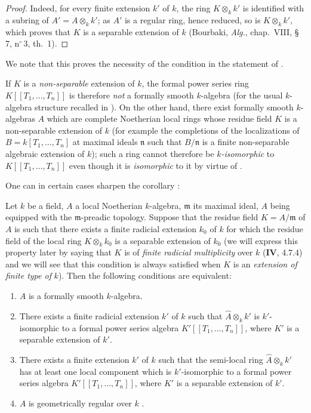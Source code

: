 \begin{proof}
Indeed, for every finite extension $k'$ of $k$, the ring $K\otimes_k k'$ is identified with a subring of $A'=A\otimes_k k'$;
as $A'$ is a regular ring, hence reduced, so is $K\otimes_k k'$, which proves that $K$ is a separable extension of $k$ (Bourbaki, \emph{Alg.}, chap.~VIII, \S\,7, n$^\circ$\,3, th.~1).
\end{proof}

We note that this proves the necessity of the condition in the statement of .

\begin{remark}[19.6.5.2]
\label{0.19.6.5.2}
If $K$ is a \emph{non-separable} extension of $k$, the formal power series ring $K[[T_1,\ldots,T_n]]$ is therefore \emph{not} a formally smooth $k$-algebra (for the usual $k$-algebra structure recalled in ).
On the other hand, there exist formally smooth $k$-algebras $A$ which are complete Noetherian local rings whose residue field $K$ is a non-separable extension of $k$ (for example the completions of the localizations of $B=k[T_1,\ldots,T_n]$ at maximal ideals $\mathfrak{n}$ such that $B/\mathfrak{n}$ is a finite non-separable algebraic extension of $k$);
such a ring cannot therefore be \emph{$k$-isomorphic} to $K[[T_1,\ldots,T_n]]$ even though it is \emph{isomorphic} to it by virtue of .

One can in certain cases sharpen the corollary :
\end{remark}

\begin{proposition}[19.6.6]
\label{0.19.6.6}
Let $k$ be a field, $A$ a local Noetherian $k$-algebra, $\mathfrak{m}$ its maximal ideal, $A$ being equipped with the $\mathfrak{m}$-preadic topology.
Suppose that the residue field $K=A/\mathfrak{m}$ of $A$ is such that there exists a finite radicial extension $k_0$ of $k$ for which the residue field of the local ring $K\otimes_k k_0$ is a separable extension of $k_0$ \textup{(we will express this property later by saying that $K$ is of \emph{finite radicial multiplicity} over $k$ ($\mathbf{IV}$, 4.7.4) and we will see that this condition is always satisfied when $K$ is an \emph{extension of finite type of} $k$)}.
Then the following conditions are equivalent:
\begin{enumerate}
  \item[\textup{a)}] $A$ is a formally smooth $k$-algebra.
  \item[\textup{b)}] There exists a finite radicial extension $k'$ of $k$ such that $\widehat{A}\otimes_k k'$ is $k'$-isomorphic to a formal power series algebra $K'[[T_1,\ldots,T_n]]$, where $K'$ is a separable extension of $k'$.
  \item[\textup{b')}] There exists a finite extension $k'$ of $k$ such that the semi-local ring $\widehat{A}\otimes_k k'$ has \textup{at least one} local component which is $k'$-isomorphic to a formal power series algebra $K'[[T_1,\ldots,T_n]]$, where $K'$ is a separable extension of $k'$.
  \item[\textup{c)}] $A$ is geometrically regular over $k$ .
\end{enumerate}
\end{proposition}

